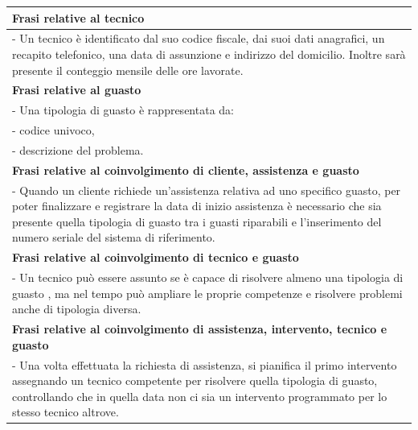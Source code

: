 \documentclass[legalpaper]{article}
\begin{document}
\begin{tabular}{ |p{16 cm}| }
\hline
\textbf{Frasi relative al tecnico}  \\
\hline
- Un tecnico è identificato dal suo codice fiscale, dai suoi dati anagrafici, un recapito telefonico, una data di assunzione e indirizzo del domicilio.\newline
Inoltre sarà presente il conteggio mensile delle ore lavorate.
\\
\hline
\textbf{Frasi relative al guasto}  \\
\hline
- Una tipologia di guasto è rappresentata da: \\
- codice univoco, \\
- descrizione del problema.\\
\hline
\textbf{Frasi relative al coinvolgimento di cliente, assistenza e guasto}  \\
\hline
- Quando un cliente richiede un'assistenza relativa ad uno specifico guasto, per poter finalizzare e registrare la data di inizio assistenza è necessario che sia presente quella tipologia di guasto tra i guasti riparabili e l'inserimento del numero seriale del sistema di riferimento.\\
\hline
\textbf{Frasi relative al coinvolgimento di tecnico e guasto}  \\
\hline
- Un tecnico può essere assunto se è capace di risolvere almeno una tipologia di guasto , ma nel tempo può ampliare le proprie competenze e risolvere problemi anche di tipologia diversa.\\
\hline


\textbf{Frasi relative al coinvolgimento di assistenza, intervento, tecnico e guasto}  \\
\hline
- Una volta effettuata la richiesta di assistenza, si pianifica il primo intervento assegnando un tecnico competente per risolvere quella tipologia di guasto, controllando che in quella data non ci sia un intervento programmato per lo stesso tecnico altrove.\\
\hline
\end{tabular}
\newpage
\end{document}
